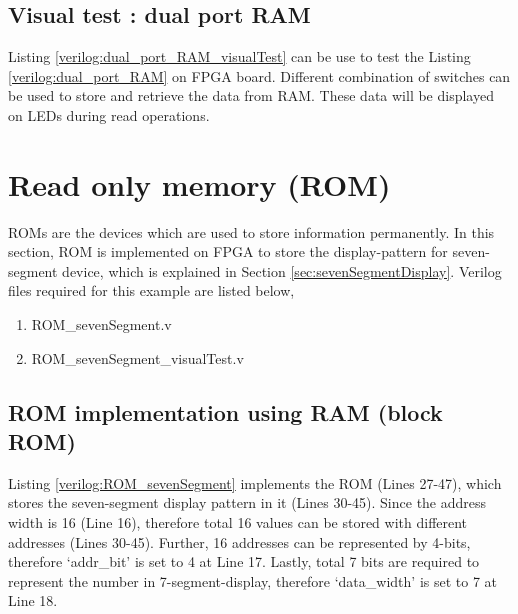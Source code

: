 

\subsection{Visual test : dual port RAM}
Listing \ref{verilog:dual_port_RAM_visualTest} can be use to test the Listing \ref{verilog:dual_port_RAM} on FPGA board. Different combination of switches can be used to store and retrieve the data from RAM. These data will be displayed on LEDs during read operations. 


\section{Read only memory (ROM)}
ROMs are the devices which are used to store information permanently. In this section, ROM is implemented on FPGA to store the display-pattern for seven-segment device, which is explained in Section \ref{sec:sevenSegmentDisplay}. Verilog files required for this example are listed below, 
\begin{enumerate}
	\item ROM\_sevenSegment.v
	\item ROM\_sevenSegment\_visualTest.v
\end{enumerate}

\subsection{ROM implementation using RAM (block ROM)} \label{sec:ROMusingRAM}
Listing \ref{verilog:ROM_sevenSegment} implements the ROM (Lines 27-47), which stores the seven-segment display pattern in it (Lines 30-45). Since the address width is 16 (Line 16), therefore total 16 values can be stored with different addresses (Lines 30-45). Further, 16 addresses can be represented by 4-bits, therefore `addr\_bit' is set to 4 at Line 17. Lastly, total 7 bits are required to represent the number in 7-segment-display, therefore `data\_width' is set to 7 at Line 18.




